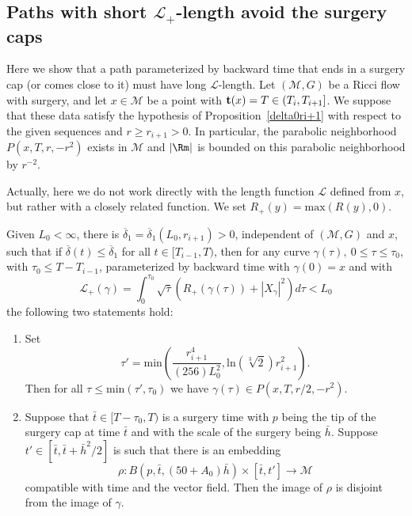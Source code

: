 \subsection{Paths with short ${\mathcal L}_+$-length avoid the surgery caps}

Here we show that a path parameterized by backward time that ends in
a surgery cap (or comes close to it)  must have
long ${\mathcal L}$-length. Let $({\mathcal M},G)$ be a Ricci flow
with surgery, and let $x\in {\mathcal M}$ be a point with ${\bf
t}(x)=T\in (T_i,T_{i+1}]$. We suppose that these data satisfy the
hypothesis of Proposition~\ref{delta0ri+1} with respect to the given
sequences and $r\ge r_{i+1}>0$. In particular, the parabolic
neighborhood $P(x,T,r,-r^2)$ exists in ${\mathcal M}$ and $|\Rm|$ is
bounded on this parabolic neighborhood by $r^{-2}$.

Actually, here we do not work directly with the length function
${\mathcal L}$ defined from $x$, but rather with a closely related
function. We set $R_+(y)=\mathrm{max}(R(y),0)$.


\begin{lemma}
\label{lem:small-L-plus-avoids-surgery-caps}
\label{L_0}
Given $L_0<\infty$, there is
$\overline\delta_1=\overline\delta_1(L_0,r_{i+1})>0$, independent of
$({\mathcal M},G)$ and $x$, such that if $\overline\delta(t)\le
\overline\delta_1$ for all $t\in [T_{i-1},T)$, then for any curve
$\gamma(\tau),\ 0\le \tau\le \tau_0$, with $\tau_0\le T-T_{i-1}$,
parameterized by backward time with $\gamma(0)=x$ and with
$${\mathcal L}_+(\gamma)=\int_0^{\tau_0}\sqrt{\tau}
\left(R_+(\gamma(\tau))+|X_\gamma|^2\right)d\tau< L_0$$ the
following two statements hold: \begin{enumerate} \item[(2)] Set
$$\tau'=\mathrm{min}\left(\frac{r_{i+1}^4}{(256)L_0^2},\mathrm{ln}(\sqrt[3]{2})r_{i+1}^2\right).$$
Then for all $\tau\le \mathrm{min}(\tau',\tau_0)$ we have $\gamma(\tau)\in P(x,T,r/2,-r^2)$.
\item[(2)] Suppose that  $\bar t\in [T-\tau_0,T)$ is a surgery time with $p$
being the tip of the surgery cap at time $\bar t$ and with the scale
of the surgery being $\bar h$. Suppose   $t'\in [\bar t,\bar t+\bar
h^2/2]$ is such that there is an embedding
$$\rho\colon B(p,\bar t,(50+A_0)\bar h)\times [\bar t,t']\to {\mathcal M}$$
compatible with time and the vector field. Then the image of $\rho$
is disjoint from the image of $\gamma$. 
\end{enumerate}
\end{lemma}

